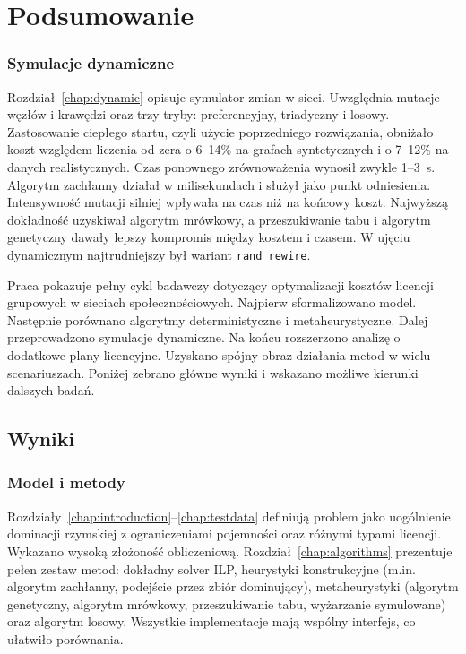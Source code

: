 \chapter{Podsumowanie}\label{chap:conclusion}

\subsection{Symulacje dynamiczne}
Rozdział~\ref{chap:dynamic} opisuje symulator zmian w sieci. Uwzględnia mutacje węzłów i krawędzi oraz trzy tryby: preferencyjny, triadyczny i losowy. Zastosowanie ciepłego startu, czyli użycie poprzedniego rozwiązania, obniżało koszt względem liczenia od zera o 6--14\% na grafach syntetycznych i o 7--12\% na danych realistycznych. Czas ponownego zrównoważenia wynosił zwykle 1--3~s. Algorytm zachłanny działał w milisekundach i służył jako punkt odniesienia. Intensywność mutacji silniej wpływała na czas niż na końcowy koszt. Najwyższą dokładność uzyskiwał algorytm mrówkowy, a przeszukiwanie tabu i algorytm genetyczny dawały lepszy kompromis między kosztem i czasem. W ujęciu dynamicznym najtrudniejszy był wariant \texttt{rand\_rewire}.

Praca pokazuje pełny cykl badawczy dotyczący optymalizacji kosztów licencji grupowych w sieciach społecznościowych. Najpierw sformalizowano model. Następnie porównano algorytmy deterministyczne i metaheurystyczne. Dalej przeprowadzono symulacje dynamiczne. Na końcu rozszerzono analizę o dodatkowe plany licencyjne. Uzyskano spójny obraz działania metod w wielu scenariuszach. Poniżej zebrano główne wyniki i wskazano możliwe kierunki dalszych badań.

\section{Wyniki}

\subsection{Model i metody}
Rozdziały~\ref{chap:introduction}--\ref{chap:testdata} definiują problem jako uogólnienie dominacji rzymskiej z ograniczeniami pojemności oraz różnymi typami licencji. Wykazano wysoką złożoność obliczeniową. Rozdział~\ref{chap:algorithms} prezentuje pełen zestaw metod: dokładny solver ILP, heurystyki konstrukcyjne (m.in. algorytm zachłanny, podejście przez zbiór dominujący), metaheurystyki (algorytm genetyczny, algorytm mrówkowy, przeszukiwanie tabu, wyżarzanie symulowane) oraz algorytm losowy. Wszystkie implementacje mają wspólny interfejs, co ułatwiło porównania.


